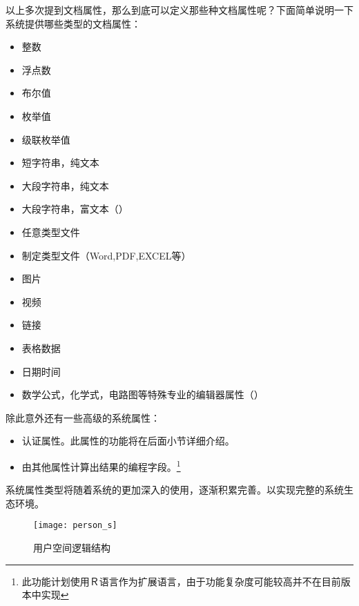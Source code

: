 以上多次提到文档属性，那么到底可以定义那些种文档属性呢？下面简单说明一下系统提供哪些类型的文档属性：
\begin{itemize}
\item 整数
\item 浮点数
\item 布尔值
\item 枚举值
\item 级联枚举值
\item 短字符串，纯文本
\item 大段字符串，纯文本
\item 大段字符串，富文本（\smarkdown）
\item 任意类型文件
\item 制定类型文件（Word,PDF,EXCEL等）
\item 图片
\item 视频
\item 链接
\item 表格数据
\item 日期时间
\item 数学公式，化学式，电路图等特殊专业的编辑器属性（）
\end{itemize}
除此意外还有一些高级的系统属性：
\begin{itemize}
\item 认证属性。此属性的功能将在后面小节详细介绍。
\item 由其他属性计算出结果的编程字段。\footnote{此功能计划使用Ｒ语言作为扩展语言，由于功能复杂度可能较高并不在目前版本中实现}
\end{itemize}
系统属性类型将随着系统的更加深入的使用，逐渐积累完善。以实现完整的系统生态环境。
\begin{figure}[H]
  \centering
  \texttt{[image: person\_s]}
  \caption{用户空间逻辑结构}
  \label{fig:xfig11}
\end{figure}

